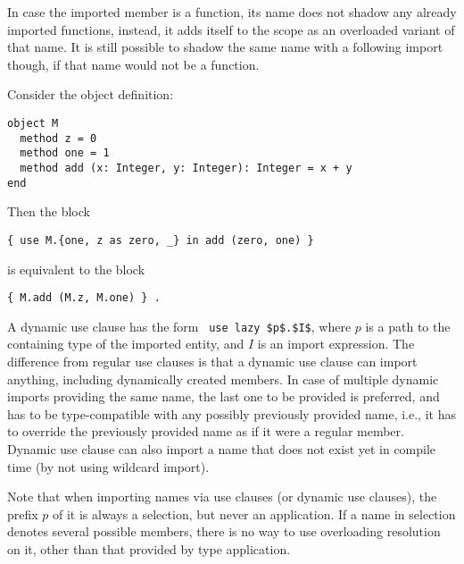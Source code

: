 In case the imported member is a function, its name does not shadow any already imported functions, instead, it adds itself to the scope as an overloaded variant of that name. It is still possible to shadow the same name with a following import though, if that name would not be a function. 

\example Consider the object definition:
\begin{lstlisting}
object M
  method z = 0
  method one = 1
  method add (x: Integer, y: Integer): Integer = x + y
end
\end{lstlisting}
Then the block
\begin{lstlisting}
{ use M.{one, z as zero, _} in add (zero, one) }
\end{lstlisting}
is equivalent to the block
\begin{lstlisting}
{ M.add (M.z, M.one) } .
\end{lstlisting}

A dynamic use clause has the form ~\lstinline!use lazy $p$.$I$!, where $p$ is a path to the containing type of the imported entity, and $I$ is an import expression. The difference from regular use clauses is that a dynamic use clause can import anything, including dynamically created members. In case of multiple dynamic imports providing the same name, the last one to be provided is preferred, and has to be type-compatible with any possibly previously provided name, i.e., it has to override the previously provided name as if it were a regular member. Dynamic use clause can also import a name that does not exist yet in compile time (by not using wildcard import). 

Note that when importing names via use clauses (or dynamic use clauses), the prefix $p$ of it is always a selection, but never an application. If a name in selection denotes several possible members, there is no way to use overloading resolution on it, other than that provided by type application. 





